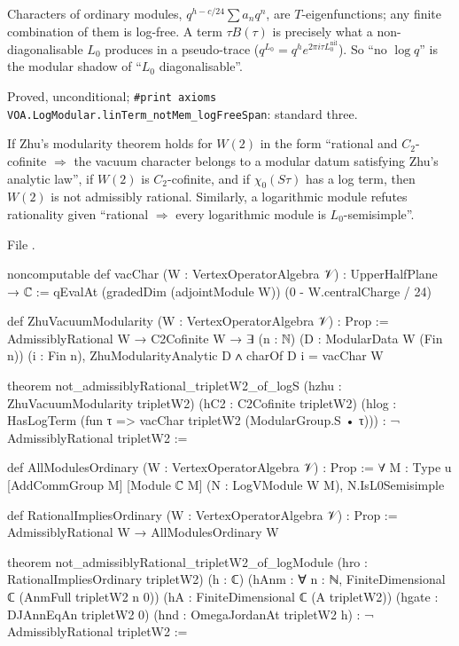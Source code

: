 \begin{physics}
Characters of ordinary modules, $q^{h-c/24}\sum a_nq^n$, are $T$-eigenfunctions; any finite combination of them is
log-free. A term $\tau B(\tau)$ is precisely what a non-diagonalisable $L_0$ produces in a pseudo-trace
($q^{L_0}=q^he^{2\pi i\tau L_0^{\mathrm{nil}}}$). So ``no $\log q$'' is the modular shadow of ``$L_0$ diagonalisable''.
\end{physics}
\begin{status}
Proved, unconditional; \texttt{\#print axioms VOA.LogModular.linTerm\_notMem\_logFreeSpan}: standard three.
\end{status}

\begin{theorem}\label{l18:thm:logS}
If Zhu's modularity theorem holds for $W(2)$ in the form ``rational and $C_2$-cofinite $\Rightarrow$ the vacuum
character belongs to a modular datum satisfying Zhu's analytic law'', if $W(2)$ is $C_2$-cofinite, and if
$\chi_0(S\tau)$ has a log term, then $W(2)$ is not admissibly rational. Similarly, a logarithmic module refutes
rationality given ``rational $\Rightarrow$ every logarithmic module is $L_0$-semisimple''.
\end{theorem}
\noindent File .
\begin{leancode}
noncomputable def vacChar (W : VertexOperatorAlgebra 𝒱) : UpperHalfPlane → ℂ :=
  qEvalAt (gradedDim (adjointModule W)) (0 - W.centralCharge / 24)

def ZhuVacuumModularity (W : VertexOperatorAlgebra 𝒱) : Prop :=
  AdmissiblyRational W → C2Cofinite W → ∃ (n : ℕ) (D : ModularData W (Fin n)) (i : Fin n),
    ZhuModularityAnalytic D ∧ charOf D i = vacChar W

theorem not_admissiblyRational_tripletW2_of_logS
    (hzhu : ZhuVacuumModularity tripletW2) (hC2 : C2Cofinite tripletW2)
    (hlog : HasLogTerm (fun τ => vacChar tripletW2 (ModularGroup.S • τ))) :
    ¬ AdmissiblyRational tripletW2 :=

def AllModulesOrdinary (W : VertexOperatorAlgebra 𝒱) : Prop :=
  ∀ {M : Type u} [AddCommGroup M] [Module ℂ M] (N : LogVModule W M), N.IsL0Semisimple

def RationalImpliesOrdinary (W : VertexOperatorAlgebra 𝒱) : Prop :=
  AdmissiblyRational W → AllModulesOrdinary W

theorem not_admissiblyRational_tripletW2_of_logModule
    (hro : RationalImpliesOrdinary tripletW2) (h : ℂ)
    (hAnm : ∀ n : ℕ, FiniteDimensional ℂ (AnmFull tripletW2 n 0))
    (hA : FiniteDimensional ℂ (A tripletW2)) (hgate : DJAnnEqAn tripletW2 0)
    (hnd : OmegaJordanAt tripletW2 h) :
    ¬ AdmissiblyRational tripletW2 :=
\end{leancode}
